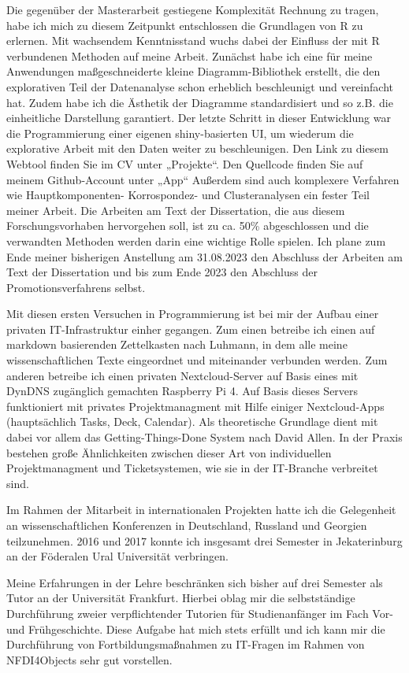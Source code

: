 \documentclass[10pt, a4paper]{article}
\begin{document}
Die gegenüber der Masterarbeit gestiegene Komplexität Rechnung zu tragen, habe ich mich zu diesem Zeitpunkt entschlossen die Grundlagen von R zu erlernen. Mit wachsendem Kenntnisstand wuchs dabei der Einfluss der mit R verbundenen Methoden auf meine Arbeit. Zunächst habe ich eine für meine Anwendungen maßgeschneiderte kleine Diagramm-Bibliothek erstellt, die den explorativen Teil der Datenanalyse schon erheblich beschleunigt und vereinfacht hat. Zudem habe ich die Ästhetik der Diagramme standardisiert und so z.B. die einheitliche Darstellung garantiert. Der letzte Schritt in dieser Entwicklung war die Programmierung einer eigenen shiny-basierten UI, um wiederum die explorative Arbeit mit den Daten weiter zu beschleunigen. Den Link zu diesem Webtool finden Sie im CV unter „Projekte“. Den Quellcode finden Sie auf meinem Github-Account unter „App“ Außerdem sind auch komplexere Verfahren wie Hauptkomponenten- Korrospondez- und Clusteranalysen ein fester Teil meiner Arbeit. Die Arbeiten am Text der Dissertation, die aus diesem Forschungsvorhaben hervorgehen soll, ist zu ca. 50\% abgeschlossen und die verwandten Methoden werden darin eine wichtige Rolle spielen. Ich plane zum Ende meiner bisherigen Anstellung am 31.08.2023 den Abschluss der Arbeiten am Text der Dissertation und bis zum Ende 2023 den Abschluss der Promotionsverfahrens selbst.

Mit diesen ersten Versuchen in Programmierung ist bei mir der Aufbau einer privaten IT-Infrastruktur einher gegangen. Zum einen betreibe ich einen auf markdown basierenden Zettelkasten nach Luhmann, in dem alle meine wissenschaftlichen Texte eingeordnet und miteinander verbunden werden. Zum anderen betreibe ich einen privaten Nextcloud-Server auf Basis eines mit DynDNS zugänglich gemachten Raspberry Pi 4. Auf Basis dieses Servers funktioniert mit privates Projektmanagment mit Hilfe einiger Nextcloud-Apps (hauptsächlich Tasks, Deck, Calendar). Als theoretische Grundlage dient mit dabei vor allem das Getting-Things-Done System nach David Allen. In der Praxis bestehen große Ähnlichkeiten zwischen dieser Art von individuellen Projektmanagment und Ticketsystemen, wie sie in der IT-Branche verbreitet sind.

Im Rahmen der Mitarbeit in internationalen Projekten hatte ich die Gelegenheit an wissenschaftlichen Konferenzen in Deutschland, Russland und Georgien teilzunehmen. 2016 und 2017 konnte ich insgesamt drei Semester in Jekaterinburg an der Föderalen Ural Universität verbringen.

Meine Erfahrungen in der Lehre beschränken sich bisher auf drei Semester als Tutor an der Universität Frankfurt. Hierbei oblag mir die selbstständige Durchführung zweier verpflichtender Tutorien für Studienanfänger im Fach Vor- und Frühgeschichte. Diese Aufgabe hat mich stets erfüllt und ich kann mir die Durchführung von Fortbildungsmaßnahmen zu IT-Fragen im Rahmen von NFDI4Objects sehr gut vorstellen.
\end{document}
